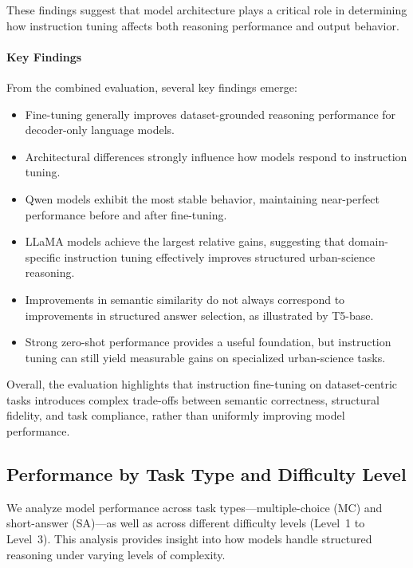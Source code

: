 \documentclass[a4paper,fleqn]{cas-sc}
\begin{document}
These findings suggest that model architecture plays a critical role in determining how instruction tuning affects both reasoning performance and output behavior.

\paragraph{Key Findings}

From the combined evaluation, several key findings emerge:

\begin{itemize}
    \item Fine-tuning generally improves dataset-grounded reasoning performance for decoder-only language models.
    
    \item Architectural differences strongly influence how models respond to instruction tuning.
    
    \item Qwen models exhibit the most stable behavior, maintaining near-perfect performance before and after fine-tuning.
    
    \item LLaMA models achieve the largest relative gains, suggesting that domain-specific instruction tuning effectively improves structured urban-science reasoning.
    
    \item Improvements in semantic similarity do not always correspond to improvements in structured answer selection, as illustrated by T5-base.
    
    \item Strong zero-shot performance provides a useful foundation, but instruction tuning can still yield measurable gains on specialized urban-science tasks.
\end{itemize}

Overall, the evaluation highlights that instruction fine-tuning on dataset-centric tasks introduces complex trade-offs between semantic correctness, structural fidelity, and task compliance, rather than uniformly improving model performance.

\subsection{Performance by Task Type and Difficulty Level}

We analyze model performance across task types—multiple-choice (MC) and short-answer (SA)—as well as across different difficulty levels (Level~1 to Level~3). This analysis provides insight into how models handle structured reasoning under varying levels of complexity.
\end{document}
